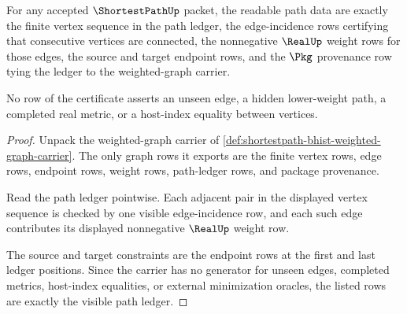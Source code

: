\begin{theorem}
\label{thm:shortestpath-visible-path-ledger}
For any accepted $\ShortestPathUp$ packet, the readable path data are exactly
the finite vertex sequence in the path ledger, the edge-incidence rows
certifying that consecutive vertices are connected, the nonnegative $\RealUp$
weight rows for those edges, the source and target endpoint rows, and the
$\Pkg$ provenance row tying the ledger to the weighted-graph carrier.

No row of the certificate asserts an unseen edge, a hidden lower-weight path,
a completed real metric, or a host-index equality between vertices.
\end{theorem}
\begin{proof}
Unpack the weighted-graph carrier of
\autoref{def:shortestpath-bhist-weighted-graph-carrier}. The only graph rows it
exports are the finite vertex rows, edge rows, endpoint rows, weight rows,
path-ledger rows, and package provenance.

Read the path ledger pointwise. Each adjacent pair in the displayed vertex
sequence is checked by one visible edge-incidence row, and each such edge
contributes its displayed nonnegative $\RealUp$ weight row.

The source and target constraints are the endpoint rows at the first and last
ledger positions. Since the carrier has no generator for unseen edges,
completed metrics, host-index equalities, or external minimization oracles, the
listed rows are exactly the visible path ledger.
\end{proof}

